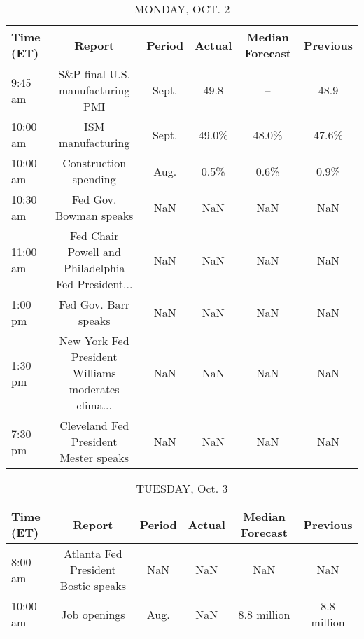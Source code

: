 \documentclass{article}%
\begin{document}
%
\normalsize%


\begin{table}[htbp]%
\caption{MONDAY, OCT. 2}%
\centering%
\begin{adjustbox}{width=1\textwidth}%
\begin{tabular}{lccccc}
\toprule
Time (ET) &                                             Report & Period & Actual & Median Forecast & Previous \\
\midrule
  9:45 am &                   S\&P final U.S. manufacturing PMI &  Sept. &   49.8 &              -- &     48.9 \\
 10:00 am &                                  ISM manufacturing &  Sept. &  49.0\% &           48.0\% &    47.6\% \\
 10:00 am &                              Construction spending &   Aug. &   0.5\% &            0.6\% &     0.9\% \\
 10:30 am &                             Fed Gov. Bowman speaks &    NaN &    NaN &             NaN &      NaN \\
 11:00 am & Fed Chair Powell and Philadelphia Fed President... &    NaN &    NaN &             NaN &      NaN \\
  1:00 pm &                               Fed Gov. Barr speaks &    NaN &    NaN &             NaN &      NaN \\
  1:30 pm & New York Fed President Williams moderates clima... &    NaN &    NaN &             NaN &      NaN \\
  7:30 pm &              Cleveland Fed President Mester speaks &    NaN &    NaN &             NaN &      NaN \\
\bottomrule
\end{tabular}
%
\end{adjustbox}%
\end{table}

%


\begin{table}[htbp]%
\caption{TUESDAY, Oct. 3}%
\centering%
\begin{adjustbox}{width=1\textwidth}%
\begin{tabular}{lccccc}
\toprule
Time (ET) &                              Report & Period & Actual & Median Forecast &    Previous \\
\midrule
  8:00 am & Atlanta Fed President Bostic speaks &    NaN &    NaN &             NaN &         NaN \\
 10:00 am &                        Job openings &   Aug. &    NaN &     8.8 million & 8.8 million \\
\bottomrule
\end{tabular}
%
\end{adjustbox}%
\end{table}
\end{document}
